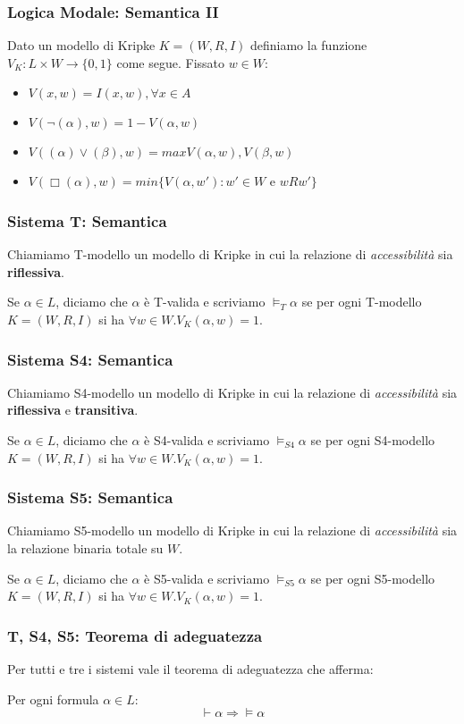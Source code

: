 \documentclass[notheorem]{beamer}
\begin{document}
\begin{frame}
\frametitle{Logica Modale: Semantica II}

Dato un modello di Kripke $K = (W, R, I)$ definiamo la funzione $V_K : L \times W \to \{0, 1\}$
come segue.
Fissato $w \in W$:
\begin{itemize}
\item $V(x, w) = I(x, w), \forall x \in A$
\item $V(\neg (\alpha), w) = 1 - V(\alpha, w)$
\item $V((\alpha) \lor (\beta), w) = max{V(\alpha, w), V(\beta, w)}$
\item {\color{red} $V(\Box (\alpha), w) = min\{ V(\alpha, w') : w' \in W$ e $w R w' \}$}
\end{itemize}
\end{frame}

\begin{frame}
\frametitle{Sistema T: Semantica}
Chiamiamo T-modello un modello di Kripke in cui la relazione di \emph{accessibilità}
sia \textbf{riflessiva}.

Se $\alpha \in L$, diciamo che $\alpha$ è T-valida e
scriviamo $\vDash_T \alpha$ se per ogni T-modello $K = (W, R, I)$
si ha $\forall w \in W. V_K(\alpha, w) = 1$.
\end{frame}

\begin{frame}
\frametitle{Sistema S4: Semantica}
Chiamiamo S4-modello un modello di Kripke in cui la relazione di \emph{accessibilità}
sia \textbf{riflessiva} e \textbf{transitiva}.

Se $\alpha \in L$, diciamo che $\alpha$ è S4-valida e scriviamo
$\vDash_{S4} \alpha$ se per ogni S4-modello $K = (W, R, I)$
si ha $\forall w \in W. V_K(\alpha, w) = 1$.
\end{frame}

\begin{frame}
\frametitle{Sistema S5: Semantica}
Chiamiamo S5-modello un modello di Kripke in cui la relazione di \emph{accessibilità}
sia la relazione binaria totale su $W$.

Se $\alpha \in L$, diciamo che $\alpha$ è S5-valida e scriviamo
$\vDash_{S5} \alpha$ se per ogni S5-modello $K = (W, R, I)$
si ha $\forall w \in W. V_K(\alpha, w) = 1$.
\end{frame}

\begin{frame}
\frametitle{T, S4, S5: Teorema di adeguatezza}
Per tutti e tre i sistemi vale il teorema di adeguatezza che afferma:

Per ogni formula $\alpha \in L$:
$$\vdash \alpha \Rightarrow \vDash \alpha$$
\end{frame}
\end{document}
